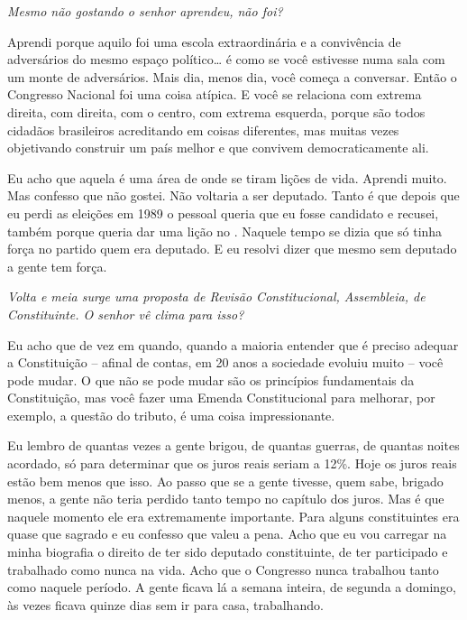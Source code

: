\medskip

\noindent\emph{Mesmo não gostando o senhor aprendeu, não foi?}

Aprendi porque aquilo foi uma escola extraordinária e a
convivência de adversários do mesmo espaço político\ldots{} é como se você
estivesse numa sala com um monte de adversários. Mais dia, menos dia,
você começa a conversar. Então o Congresso Nacional foi uma coisa
atípica. E você se relaciona com extrema direita, com direita, com o
centro, com extrema esquerda, porque são todos cidadãos brasileiros
acreditando em coisas diferentes, mas muitas vezes objetivando construir
um país melhor e que convivem democraticamente ali.

Eu acho que aquela é uma área de onde se tiram lições de vida. Aprendi
muito. Mas confesso que não gostei. Não voltaria a ser deputado. Tanto é
que depois que eu perdi as eleições em 1989 o pessoal queria que eu
fosse candidato e recusei, também porque queria dar uma lição no .
Naquele tempo se dizia que só tinha força no partido quem era deputado.
E eu resolvi dizer que mesmo sem deputado a gente tem força.

\medskip

\noindent\emph{Volta e meia surge uma proposta de Revisão Constitucional,
Assembleia, de Constituinte. O senhor vê clima para isso?}

Eu acho que de vez em quando, quando a maioria entender
que é preciso adequar a Constituição -- afinal de contas, em 20 anos a
sociedade evoluiu muito -- você pode mudar. O que não se pode mudar são
os princípios fundamentais da Constituição, mas você fazer uma Emenda
Constitucional para melhorar, por exemplo, a questão do tributo, é uma
coisa impressionante.

Eu lembro de quantas vezes a gente brigou, de quantas guerras, de
quantas noites acordado, só para determinar que os juros reais seriam a
12\%. Hoje os juros reais estão bem menos que isso. Ao passo que se a
gente tivesse, quem sabe, brigado menos, a gente não teria perdido tanto
tempo no capítulo dos juros. Mas é que naquele momento ele era
extremamente importante. Para alguns constituintes era quase que sagrado
e eu confesso que valeu a pena. Acho que eu vou carregar na minha
biografia o direito de ter sido deputado constituinte, de ter
participado e trabalhado como nunca na vida. Acho que o Congresso nunca
trabalhou tanto como naquele período. A gente ficava lá a semana
inteira, de segunda a domingo, às vezes ficava quinze dias sem ir para
casa, trabalhando.

